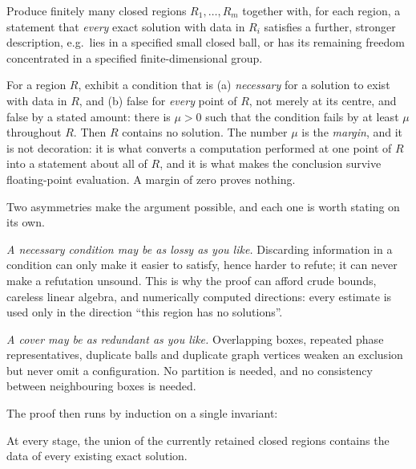 \documentclass[11pt]{article}
\theoremstyle{definition}
\theoremstyle{plain}
\theoremstyle{definition}
\begin{document}
\begin{description}[leftmargin=1.2em,style=nextline]
\item[(C) Cover.] Produce finitely many closed regions $R_1,\dots,R_m$ together with, for each region,
a statement that \emph{every} exact solution with data in $R_i$ satisfies a further, stronger
description, e.g.\ lies in a specified small closed ball, or has its remaining freedom concentrated
in a specified finite-dimensional group.
\item[(E) Exclude.] For a region $R$, exhibit a condition that is (a) \emph{necessary} for a solution
to exist with data in $R$, and (b) false for \emph{every} point of $R$, not merely at its centre, and
false by a stated amount: there is $\mu>0$ such that the condition fails by at least $\mu$ throughout
$R$. Then $R$ contains no solution. The number $\mu$ is the \emph{margin}, and it is not decoration:
it is what converts a computation performed at one point of $R$ into a statement about all of $R$, and
it is what makes the conclusion survive floating-point evaluation. A margin of zero proves nothing.
\end{description}

\begin{warnbox}
Two asymmetries make the argument possible, and each one is worth stating on its own.

\emph{A necessary condition may be as lossy as you like.} Discarding information in a condition can
only make it easier to satisfy, hence harder to refute; it can never make a refutation unsound. This
is why the proof can afford crude bounds, careless linear algebra, and numerically computed
directions: every estimate is used only in the direction ``this region has no solutions''.

\emph{A cover may be as redundant as you like.} Overlapping boxes, repeated phase representatives,
duplicate balls and duplicate graph vertices weaken an exclusion but never omit a configuration. No
partition is needed, and no consistency between neighbouring boxes is needed.
\end{warnbox}

The proof then runs by induction on a single invariant:

\begin{tcolorbox}[colback=MidnightBlue!4,colframe=MidnightBlue!60!black,fonttitle=\bfseries,
title=The invariant]
At every stage, the union of the currently retained closed regions contains the data of every
existing exact solution.
\end{tcolorbox}
\end{document}
